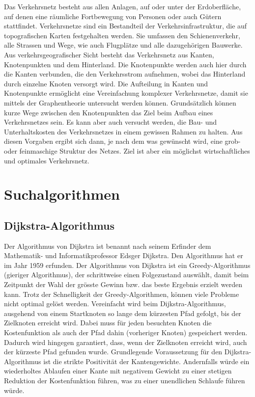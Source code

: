 \label{section:verkehr/einfuehrung}

Das Verkehrsnetz besteht aus allen Anlagen, auf oder unter der Erdoberfläche, auf denen eine räumliche Fortbewegung von Personen oder auch Gütern stattfindet. Verkehrsnetze sind ein Bestandteil der Verkehrsinfrastruktur, die auf topografischen Karten festgehalten werden. Sie umfassen den Schienenverkehr, alle Strassen und Wege, wie auch Flugplätze und alle dazugehörigen Bauwerke.
Aus verkehrsgeografischer Sicht besteht das Verkehrsnetz aus Kanten, Knotenpunkten und dem Hinterland. Die Knotenpunkte werden auch hier durch die Kanten verbunden, die den Verkehrsstrom aufnehmen, wobei das Hinterland durch einzelne Knoten versorgt wird. Die Aufteilung in Kanten und Knotenpunkte ermöglicht eine Vereinfachung komplexer Verkehrsnetze, damit sie mittels der Graphentheorie untersucht werden können.
Grundsätzlich können kurze Wege zwischen den Knotenpunkten das Ziel beim Aufbau eines Verkehrsnetzes sein. Es kann aber auch versucht werden, die Bau- und Unterhaltskosten des Verkehrsnetzes in einem gewissen Rahmen zu halten. Aus diesen Vorgaben ergibt sich dann, je nach dem was gewünscht wird, eine grob- oder feinmaschige Struktur des Netzes.
Ziel ist aber ein möglichst wirtschaftliches und optimales Verkehrsnetz.

\section{Suchalgorithmen}

\subsection{Dijkstra-Algorithmus}
Der Algorithmus von Dijkstra ist benannt nach seinem Erfinder dem Mathematik- und Informatikprofessor Edsger Dijkstra. Den Algorithmus hat er im Jahr 1959 erfunden.
Der Algorithmus von Dijkstra ist ein Greedy-Algorithmus (gieriger Algorithmus), der schrittweise einen Folgezustand auswählt, damit beim Zeitpunkt der Wahl der grösste Gewinn bzw. das beste Ergebnis erzielt werden kann.
Trotz der Schnelligkeit der Greedy-Algorithmen, können viele Probleme nicht optimal gelöst werden.
Vereinfacht wird beim Dijkstra-Algorithmus, ausgehend von einem Startknoten so lange dem kürzesten Pfad gefolgt, bis der Zielknoten erreicht wird. Dabei muss für jeden besuchten Knoten die Kostenfunktion als auch der Pfad dahin (vorheriger Knoten) gespeichert werden.
Dadurch wird hingegen garantiert, dass, wenn der Zielknoten erreicht wird, auch der kürzeste Pfad gefunden wurde.
Grundlegende Voraussetzung für den Dijkstra-Algorithmus ist die strikte Positivität der Kantengewichte. Andernfalls würde ein wiederholtes Ablaufen einer Kante mit negativem Gewicht zu einer stetigen Reduktion der Kostenfunktion führen, was zu einer unendlichen Schlaufe führen würde.

